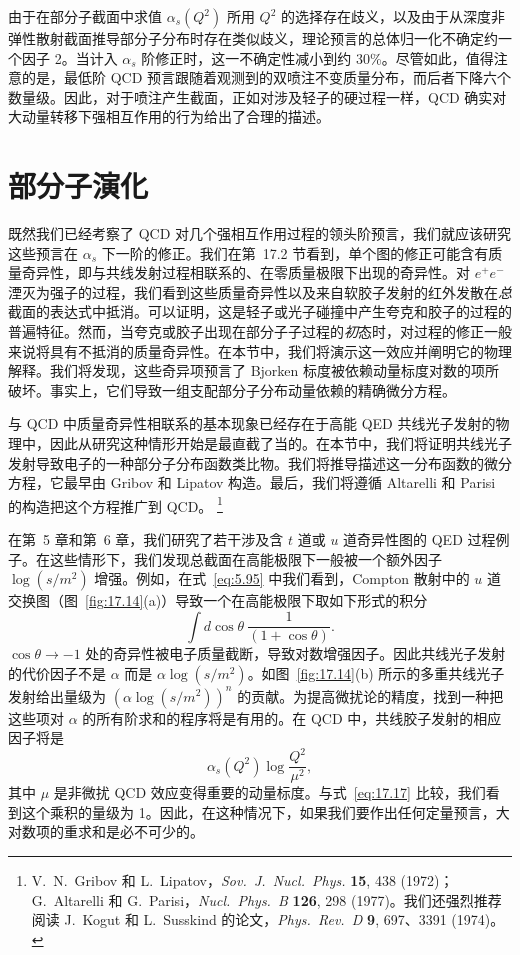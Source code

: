 由于在部分子截面中求值 $\alpha_s(Q^2)$ 所用 $Q^2$ 的选择存在歧义，以及由于从深度非弹性散射截面推导部分子分布时存在类似歧义，理论预言的总体归一化不确定约一个因子 2。当计入 $\alpha_s$ 阶修正时，这一不确定性减小到约 30\%。尽管如此，值得注意的是，最低阶 QCD 预言跟随着观测到的双喷注不变质量分布，而后者下降六个数量级。因此，对于喷注产生截面，正如对涉及轻子的硬过程一样，QCD 确实对大动量转移下强相互作用的行为给出了合理的描述。

\section{部分子演化}

既然我们已经考察了 QCD 对几个强相互作用过程的领头阶预言，我们就应该研究这些预言在 $\alpha_s$ 下一阶的修正。我们在第~17.2 节看到，单个图的修正可能含有质量奇异性，即与共线发射过程相联系的、在零质量极限下出现的奇异性。对 $e^{+}e^{-}$ 湮灭为强子的过程，我们看到这些质量奇异性以及来自软胶子发射的红外发散在\emph{总}截面的表达式中抵消。可以证明，这是轻子或光子碰撞中产生夸克和胶子的过程的普遍特征。然而，当夸克或胶子出现在部分子子过程的\emph{初}态时，对过程的修正一般来说将具有不抵消的质量奇异性。在本节中，我们将演示这一效应并阐明它的物理解释。我们将发现，这些奇异项预言了 Bjorken 标度被依赖动量标度对数的项所破坏。事实上，它们导致一组支配部分子分布动量依赖的精确微分方程。

与 QCD 中质量奇异性相联系的基本现象已经存在于高能 QED 共线光子发射的物理中，因此从研究这种情形开始是最直截了当的。在本节中，我们将证明共线光子发射导致电子的一种部分子分布函数类比物。我们将推导描述这一分布函数的微分方程，它最早由 Gribov 和 Lipatov 构造。最后，我们将遵循 Altarelli 和 Parisi 的构造把这个方程推广到 QCD。%
\footnote{V.~N.~Gribov 和 L.~Lipatov，\emph{Sov.\ J.\ Nucl.\ Phys.} \textbf{15}, 438 (1972)；G.~Altarelli 和 G.~Parisi，\emph{Nucl.\ Phys.\ B} \textbf{126}, 298 (1977)。我们还强烈推荐阅读 J.~Kogut 和 L.~Susskind 的论文，\emph{Phys.\ Rev.\ D} \textbf{9}, 697、3391 (1974)。}

在第~5 章和第~6 章，我们研究了若干涉及含 $t$ 道或 $u$ 道奇异性图的 QED 过程例子。在这些情形下，我们发现总截面在高能极限下一般被一个额外因子 $\log(s/m^2)$ 增强。例如，在式~\eqref{eq:5.95} 中我们看到，Compton 散射中的 $u$ 道交换图（图~\ref{fig:17.14}(a)）导致一个在高能极限下取如下形式的积分
\begin{equation}
  \int d\cos\theta\ \frac{1}{(1+\cos\theta)} .
\end{equation}
$\cos\theta\to -1$ 处的奇异性被电子质量截断，导致对数增强因子。因此共线光子发射的代价因子不是 $\alpha$ 而是 $\alpha\log(s/m^2)$。如图~\ref{fig:17.14}(b) 所示的多重共线光子发射给出量级为 $(\alpha\log(s/m^2))^n$ 的贡献。为提高微扰论的精度，找到一种把这些项对 $\alpha$ 的所有阶求和的程序将是有用的。在 QCD 中，共线胶子发射的相应因子将是
\begin{equation}
  \alpha_s(Q^2)\log\frac{Q^2}{\mu^2} ,
\end{equation}
其中 $\mu$ 是非微扰 QCD 效应变得重要的动量标度。与式~\eqref{eq:17.17} 比较，我们看到这个乘积的量级为 1。因此，在这种情况下，如果我们要作出任何定量预言，大对数项的重求和是必不可少的。

